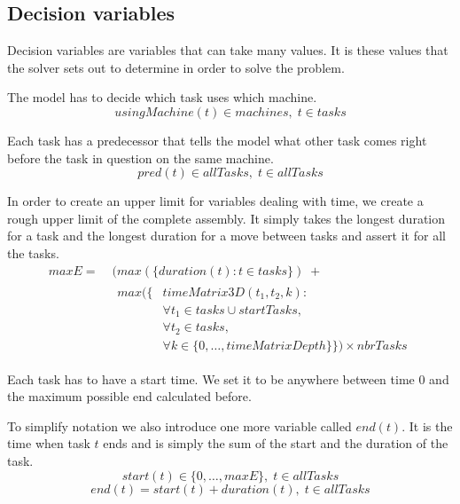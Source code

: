  
 \subsection{Decision variables}
 Decision variables are variables that can take many values. It is these values that the solver sets out to determine in order to solve the problem.

  \noindent The model has to decide which task uses which machine.
 \begin{equation}\label{eq:40}
 usingMachine(t) \in machines, \; t \in tasks
 \end{equation}

  \noindent Each task has a predecessor that tells the model what other task comes right before the task in question on the same machine.
 \begin{equation}\label{eq:41}
 pred(t) \in allTasks, \; t \in allTasks
 \end{equation}

  \noindent In order to create an upper limit for variables dealing with time, we create a rough upper limit of the complete assembly. It simply takes the longest duration for a task and the longest duration for a move between tasks and assert it for all the tasks.
 \begin{equation}
 \begin{aligned}\label{eq:maxE}
 maxE = \; &(max(\{duration(t) : t \in tasks\}) \; +  \\ 
 &\begin{aligned}
 max(\{&timeMatrix3D(t_1,t_2,k) : \\
 &\forall t_1 \in tasks \cup startTasks,  \\ 
 &\forall t_2 \in tasks,\\
 &\forall k \in \{0 , \ldots , timeMatrixDepth\}\}) \times nbrTasks
  \end{aligned}
 \end{aligned}
 \end{equation}

  \noindent Each task has to have a start time. We set it to be anywhere between time $0$ and the maximum possible end calculated before.
 
 To simplify notation we also introduce one more variable called $end(t)$. It is the time when task $t$ ends and is simply the sum of the start and the duration of the task.
 \begin{equation}\label{eq:46}
 start(t) \in \{0 , \ldots , maxE\}, \; t \in allTasks
 \end{equation} 
 \begin{equation}\label{eq:47}
 end(t) = start(t) + duration(t), \; t \in allTasks
 \end{equation}

